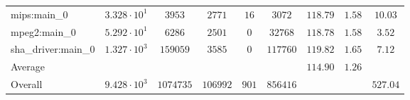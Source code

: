 \begin{tabular}{|l|c|c|c|c|c|c|c|c|}
mips:main\_0            & $ 3.328 \cdot 10^{1} $ & $ 3953    $ & $ 2771   $ & $ 16  $ & $ 3072   $ & $ 118.79      $ & $ 1.58    $ & $ 10.03   $ \\
mpeg2:main\_0           & $ 5.292 \cdot 10^{1} $ & $ 6286    $ & $ 2501   $ & $ 0   $ & $ 32768  $ & $ 118.78      $ & $ 1.58    $ & $ 3.52    $ \\
sha\_driver:main\_0     & $ 1.327 \cdot 10^{3} $ & $ 159059  $ & $ 3585   $ & $ 0   $ & $ 117760 $ & $ 119.82      $ & $ 1.65    $ & $ 7.12    $ \\
\hline
Average                 & $                    $ & $         $ & $        $ & $     $ & $        $ & $ 114.90      $ & $ 1.26    $ & $         $ \\
\hline
Overall                 & $ 9.428 \cdot 10^{3} $ & $ 1074735 $ & $ 106992 $ & $ 901 $ & $ 856416 $ & $             $ & $         $ & $ 527.04  $ \\
\hline
\end{tabular}

